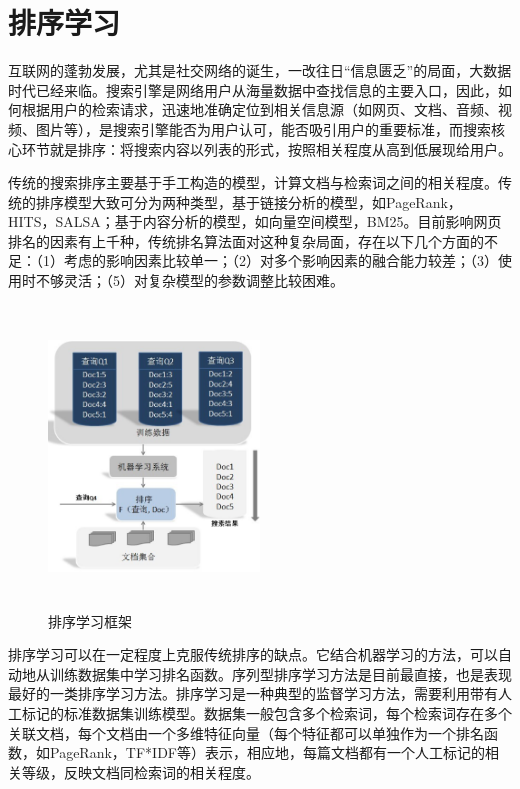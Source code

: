 \chapter{排序学习}\label{chapt:l2r}

互联网的蓬勃发展，尤其是社交网络的诞生，一改往日“信息匮乏”的局面，大数据时代已经来临。搜索引擎是网络用户从海量数据中查找信息的主要入口，因此，如何根据用户的检索请求，迅速地准确定位到相关信息源（如网页、文档、音频、视频、图片等），是搜索引擎能否为用户认可，能否吸引用户的重要标准，而搜索核心环节就是排序：将搜索内容以列表的形式，按照相关程度从高到低展现给用户。

传统的搜索排序主要基于手工构造的模型，计算文档与检索词之间的相关程度。传统的排序模型大致可分为两种类型，基于链接分析的模型，如PageRank\cite{brin1998anatomy,page1999pagerank}， HITS\cite{kleinberg1999authoritative}，SALSA\cite{lempel2000stochastic,lempel2001salsa}；基于内容分析的模型，如向量空间模型\cite{salton1975vector}，BM25\cite{robertson2009probabilistic}。目前影响网页排名的因素有上千种，传统排名算法面对这种复杂局面，存在以下几个方面的不足：（1）考虑的影响因素比较单一；（2）对多个影响因素的融合能力较差；（3）使用时不够灵活；（5）对复杂模型的参数调整比较困难。
\begin{figure}[htbp]
  \centering
  \includegraphics[width=0.5\textwidth,height=8cm]{figures/l2r.eps}
  \caption{排序学习框架}\label{fig:l2rframwork}
\end{figure}

排序学习\cite{trotman2005learning,liu2009learning}可以在一定程度上克服传统排序的缺点。它结合机器学习的方法，可以自动地从训练数据集中学习排名函数。序列型排序学习方法是目前最直接，也是表现最好的一类排序学习方法。排序学习是一种典型的监督学习方法，需要利用带有人工标记的标准数据集训练模型。数据集一般包含多个检索词，每个检索词存在多个关联文档，每个文档由一个多维特征向量（每个特征都可以单独作为一个排名函数，如PageRank，TF*IDF等）表示，相应地，每篇文档都有一个人工标记的相关等级，反映文档同检索词的相关程度。

